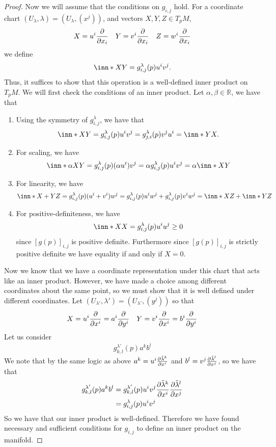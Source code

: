 \documentclass[a4paper]{article}
\begin{document}
\begin{proof}
  Now we will assume that the conditions on $g_{i,j}$ hold. For a coordinate chart $(U_{\lambda}, \lambda) = (U_{\lambda}, (x^j))$, and vectors $X, Y, Z \in T_pM$,
  \[
    X = u^i \pdv{x_i} \quad Y = v^i \pdv{x_i} \quad Z = w^i \pdv{x_i}
  \]
  we define
  \[
    \inn*{X}{Y} = g_{i,j}^{\lambda}(p)u^iv^j.
  \]
  Thus, it suffices to show that this operation is a well-defined inner product on $T_pM$. We will first check the conditions of an inner product. Let $\alpha, \beta \in \mathds{R}$, we have that
  \begin{enumerate}
    \item Using the symmetry of $g_{i,j}^\lambda$, we have that
      \[
        \inn*{X}{Y} = g_{i,j}^\lambda(p) u^iv^j = g_{j,i}^\lambda(p) v^j u^i = \inn*{Y}{X}.
      \]
    \item For scaling, we have
      \[
        \inn*{\alpha X}{Y} = g_{i,j}^\lambda(p) (\alpha u^i)v^j = \alpha g_{i,j}^\lambda(p) u^iv^j = \alpha \inn*{X}{Y}
      \]
    \item For linearity, we have
      \[
        \inn*{X + Y}{Z} = g_{i,j}^\lambda(p) (u^i + v^i)w^j = g_{i,j}^\lambda(p) u^iw^j + g_{i,j}^\lambda(p) v^iw^j = \inn*{X}{Z} + \inn*{Y}{Z}
      \]
    \item For positive-definiteness, we have
      \[
        \inn*{X}{X} = g_{i,j}^\lambda(p) u^iu^j \geq 0
      \]
      since $[g(p)]_{i,j}$ is positive definite. Furthermore since $[g(p)]_{i,j}$ is strictly positive definite we have equality if and only if $X = 0$.
  \end{enumerate}
  Now we know that we have a coordinate representation under this chart that acts like an inner product. However, we have made a choice among different coordinates about the same point, so we must show that it is well defined under different coordinates. Let $(U_{\lambda'}, \lambda') = (U_{\lambda'}, (y^j))$ so that
  \[
    X = u^i \pdv{x^i} = a^i \pdv{y^i} \quad Y = v^i \pdv{x^i} = b^i \pdv{y^i}
  \]
  Let us consider
  \[
    \begin{aligned}
      g_{k,l}^{\lambda'}(p) a^k b^l
    \end{aligned}
  \]
  We note that by the same logic as above $a^k = u^i \pdv{\tilde{\lambda}^k}{x^i}$ and $b^l = v^j \pdv{\tilde{\lambda}^l}{x^j}$, so we have that
  \[
    \begin{aligned}
      g_{k,l}^{\lambda'}(p) a^k b^l &= g_{k,l}^{\lambda'}(p) u^i v^j \pdv{\tilde{\lambda}^k}{x^i} \pdv{\tilde{\lambda}^l}{x^j} \\
                                    &= g_{i,j}^\lambda(p) u^i v^j
    \end{aligned}
  \]
  So we have that our inner product is well-defined. Therefore we have found necessary and sufficient conditions for $g_{i,j}$ to define an inner product on the manifold.
    
  
\end{proof}
\end{document}
